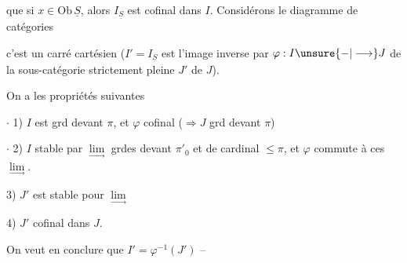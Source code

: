 
que si $x\in\mathrm{Ob}\,\underline S$, alors $I_{\underline S}$ est cofinal dans $I$. Considérons  le diagramme de catégories


c'est un carré cartésien ($I'=I_{\underline S}$ est l'image inverse par $\varphi:I\unsure{-|\longrightarrow}J$ de la sous-catégorie strictement pleine $J'$ de $J$). 

On a les propriétés suivantes

$\cdot$ 1) $I$ est grd devant $\pi$, et $\varphi$ cofinal ($\Longrightarrow J$ grd devant $\pi$)

$\cdot$ 2) $I$ stable par $\underset{\longrightarrow}{\lim}$ grdes devant $\pi'_0$ et de cardinal $\leq\pi$, et $\varphi$ commute à ces $\underset{\longrightarrow}{\lim}$.



3) $J'$ est  stable pour \deleted{$\unsure{\lim}$} $\underset{\longrightarrow}{\lim}$  

4) $J'$ cofinal dans $J$.

On veut en conclure que $I'=\varphi^{-1}(J')$ --

